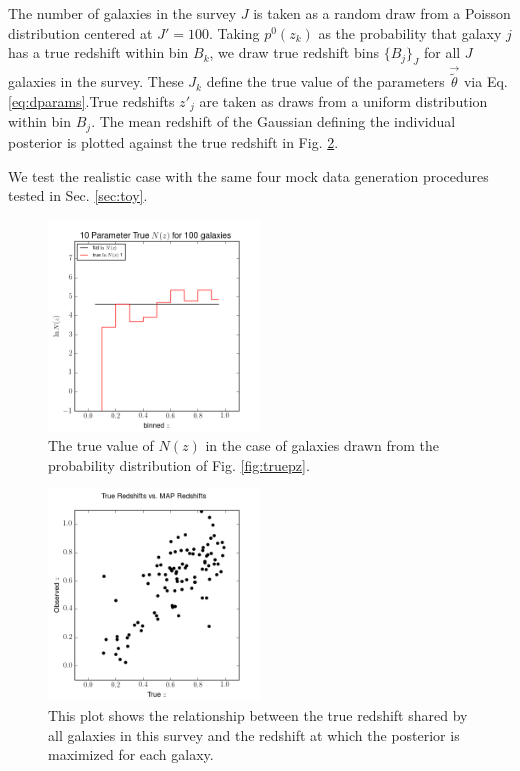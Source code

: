 \documentclass[preprint]{aastex}
\begin{document}
The number of galaxies in the survey $J$ is taken as a random draw from a Poisson distribution centered at $J'=100$.  Taking $p^{0}(z_{k})$ as the probability that galaxy $j$ has a true redshift within bin $B_{k}$, we draw true redshift bins $\{B_{j}\}_{J}$ for all $J$ galaxies in the survey.  These $J_{k}$ define the true value of the parameters $\vec{\tilde{\theta}}$ via Eq. \ref{eq:dparams}.True redshifts $z'_{j}$ are taken as draws from a uniform distribution within bin $B_{j}$.  The mean redshift of the Gaussian defining the individual posterior is plotted against the true redshift in Fig. \ref{fig:realcat}.

We test the realistic case with the same four mock data generation procedures tested in Sec. \ref{sec:toy}.

\begin{figure}
\includegraphics[width=0.5\textwidth]{real/trueNz.png}
\caption{The true value of $N(z)$ in the case of galaxies drawn from the probability distribution of Fig. \ref{fig:truepz}.}
\label{fig:realtrueNz}
\end{figure}

\begin{figure}
\includegraphics[width=0.5\textwidth]{real/truevmap.png}
\caption{This plot shows the relationship between the true redshift shared by all galaxies in this survey and the redshift at which the posterior is maximized for each galaxy.}
\label{fig:realcat}
\end{figure}
\end{document}
